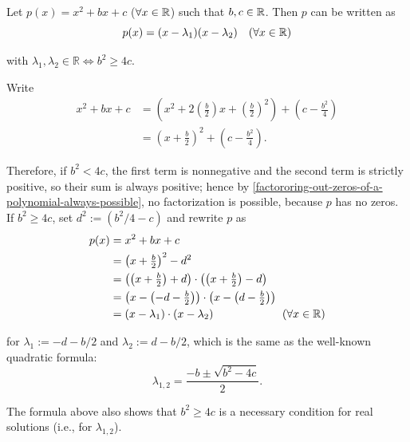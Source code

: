 \begin{thm} 
  \label{thm: factorization of a quadratic polynomial}
  Let $p(x)=x^2+bx+c$ ($\forall x \in \mathbb{R}$) such that $b,c \in \mathbb{R}$. Then $p$ can be written as
  \begin{equation}
      p(x)=(x-\lambda_1)(x-\lambda_2) \quad (\forall x \in \mathbb{R})
  \end{equation}

  with $\lambda_1, \lambda_2 \in \mathbb{R} \iff b^2 \geq 4c$.
\end{thm}
\begin{prf}
  Write
  \begin{equation}
    \begin{aligned}
      x^2+bx+c
      & =\left(x^2 + 2 \left(\tfrac{b}{2}\right)x + \left(\tfrac{b}{2}\right)^2 \right) +\left(c-\tfrac{b^2}{4} \right) \\
      & = \left(x+\tfrac{b}{2} \right)^2+\left(c-\tfrac{b^2}{4} \right).
    \end{aligned}
  \end{equation}

  Therefore, if $b^2<4c$, the first term is nonnegative and the second term is strictly positive, so their sum is always positive; hence by \ref{factororing-out-zeros-of-a-polynomial-always-possible}, no factoriza\-tion is possible, because $p$ has no zeros.
  If $b^2 \geq 4c$, set $d^2 := \left({b^2} / {4}-c\right)$ and rewrite $p$ as
  \begin{equation}
	  \begin{aligned}
	    p(x)&=x^2+bx+c \\
		  &= \left (x+\tfrac{b}{2} \right )^2-d^2 \\
		  &= \left ( \left(x+\tfrac{b}{2} \right) +d \right) \cdot \left ( \left(x+\tfrac{b}{2} \right) - d \right) \\
		  &= \left (x-\left(-d -\tfrac{b}{2} \right) \right) \cdot \left (x-\left(d-\tfrac{b}{2} \right)\right) \\
		  &= \left(x-\lambda_1 \right) \cdot \left(x-\lambda_2\right) \qquad \qquad \qquad (\forall x \in \mathbb{R})
	  \end{aligned}
  \end{equation}

  for $\lambda_1 := -d-{b}/{2}$ and $\lambda_2 := d-{b}/{2}$,
  which is the same as the well-known quadratic formula:
  \begin{equation}
    \lambda_{1,2} = \frac{-b \pm \sqrt{b^2-4c}}{2}.
  \end{equation}

  The formula above also shows that $b^2 \geq 4c$ is a necessary condition for real solutions (i.e., for $\lambda_{1,2}$).
\end{prf}

